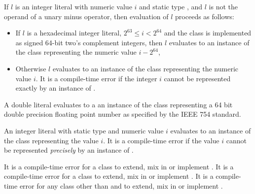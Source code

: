 \documentclass[makeidx]{article}
\begin{document}
{\LMHash{}%
If $l$ is an integer literal with numeric value $i$ and static type ,
and $l$ is not the operand of a unary minus operator,
then evaluation of $l$ proceeds as follows:
\begin{itemize}
  \item{} If $l$ is a hexadecimal integer literal,
  $2^{63} \le i < 2^{64}$ and the  class is implemented as
  signed 64-bit two's complement integers,
  then $l$ evaluates to an instance of the  class
  representing the numeric value $i - 2^{64}$,
  \item{} Otherwise $l$ evaluates to an instance of the  class
  representing the numeric value $i$.
  It is a compile-time error if the integer $i$ cannot be represented
  exactly by an instance of .
\end{itemize}


\LMHash{}%
A double literal evaluates to a an instance of the  class
representing a 64 bit double precision floating point number
as specified by the IEEE 754 standard.

\LMHash{}%
An integer literal with static type  and numeric value $i$
evaluates to an instance of the  class representing the value $i$.
It is a compile-time error if the value $i$
cannot be represented \emph{precisely} by an instance of .


\LMHash{}%
It is a compile-time error for a class to extend, mix in or implement .
It is a compile-time error for a class to extend, mix in or implement .
It is a compile-time error for any class other than  and  to extend, mix in or implement .

}
\end{document}
